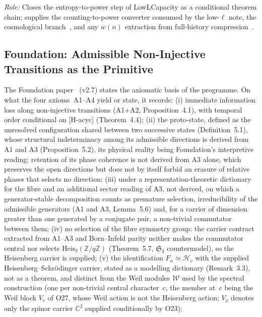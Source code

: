 \documentclass[11pt,a4paper]{article}
\newcommand{\Heis}{\mathrm{Heis}}
\begin{document}
    \textit{Role:} Closes the entropy-to-power step of LowLCapacity as a conditional theorem chain;
    supplies the counting-to-power converter consumed by the low-$\ell$ note, the cosmological
    branch~\cite{Beau2026d}, and any $w(n)$ extraction from full-history
    compression~\cite{Beau2026tb}.

  \subsection{Foundation: Admissible Non-Injective Transitions as the Primitive}
    \label{sec:foundation}

    The Foundation paper~\cite{Beau2026m} (v2.7) states the axiomatic basis of the programme.
    On what the four axioms~A1--A4 yield or state, it records:
    (i) immediate information loss along non-injective transitions (A1+A2, Proposition~4.1), with
    temporal order conditional on [H-acyc] (Theorem~4.4);
    (ii) the proto-state, defined as the unresolved configuration shared between two successive states
    (Definition~5.1), whose structural indeterminacy among its admissible directions is derived from A1 and A3
    (Proposition~5.2), its physical reality being Foundation's interpretive reading; retention of its phase coherence is not derived from A3 alone, which preserves the open directions
    but does not by itself forbid an erasure of relative phases that selects no direction;
    (iii) under a representation-theoretic dictionary for the fibre and an additional sector reading of A3, not
    derived, on which a generator-stable decomposition counts as premature selection, irreducibility of the
    admissible generators (A1 and A3, Lemma~5.6) and, for a carrier of dimension greater than one generated by a
    conjugate pair,
    a non-trivial commutator between them;
    (iv) no selection of the fibre symmetry group: the carrier contract extracted from A1--A3 and Born--Infeld
    parity neither makes the commutator central nor selects $\Heis_3(\mathbb{Z}/q\mathbb{Z})$ (Theorem~5.7,
    $\mathfrak{S}_3$ countermodel), so the Heisenberg carrier is supplied;
    (v) the identification $F_n \simeq \mathcal{H}_c$ with the supplied Heisenberg--Schr\"odinger
    carrier, stated as a modelling dictionary (Remark~3.3), not as a theorem, and distinct from the Weil
    modules $\mathcal{W}$ used by the spectral construction (one per non-trivial central character~$c$, the member
    at~$c$ being the Weil block $V_c$ of O27, whose Weil action is not the Heisenberg action; $V_\rho$ denotes only
    the spinor carrier $\mathbb{C}^2$ supplied conditionally by O23);
\end{document}
